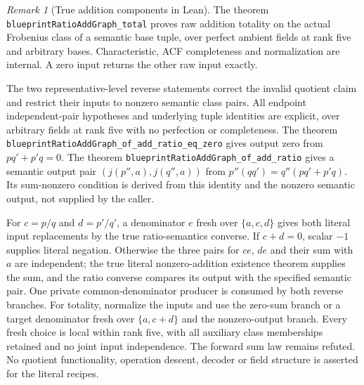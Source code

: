 \documentclass[11pt,oneside]{article}
\theoremstyle{definition}
\theoremstyle{remark}
\newtheorem{remark}[theorem]{Remark}
\newcommand{\lean}[1]{\nolinkurl{#1}}
\begin{document}
\begin{remark}[True addition components in Lean]\label{rem:literal-addition-laws}
The theorem \lean{blueprintRatioAddGraph_total} proves raw addition totality on the
actual Frobenius class of a semantic base tuple, over perfect ambient fields at rank
five and arbitrary bases. Characteristic, ACF completeness and normalization are internal.
A zero input returns the other raw input exactly.

The two representative-level reverse statements correct the invalid quotient claim and
restrict their inputs to nonzero semantic class pairs. All endpoint independent-pair
hypotheses and underlying tuple identities are explicit, over arbitrary fields at rank
five with no perfection or completeness. The theorem
\lean{blueprintRatioAddGraph_of_add_ratio_eq_zero} gives output zero from
$pq'+p'q=0$. The theorem \lean{blueprintRatioAddGraph_of_add_ratio} gives a semantic
output pair $(j(p'',a),j(q'',a))$ from $p''(qq')=q''(pq'+p'q)$. Its sum-nonzero condition
is derived from this identity and the nonzero semantic output, not supplied by the caller.

For $c=p/q$ and $d=p'/q'$, a denominator $e$ fresh over $\{a,c,d\}$ gives both
literal input replacements by the true ratio-semantics converse. If $c+d=0$, scalar
$-1$ supplies literal negation. Otherwise the three pairs for $ce$, $de$ and their sum
with $a$ are independent; the true literal nonzero-addition existence theorem supplies
the sum, and the ratio converse compares its output with the specified semantic pair.
One private common-denominator producer is consumed by both reverse branches.
For totality, normalize the inputs and use the zero-sum branch or a target denominator
fresh over $\{a,c+d\}$ and the nonzero-output branch. Every fresh choice is local within
rank five, with all auxiliary class memberships retained and no joint input independence.
The forward sum law remains refuted. No quotient functionality, operation descent,
decoder or field structure is asserted for the literal recipes.
\end{remark}
\end{document}
